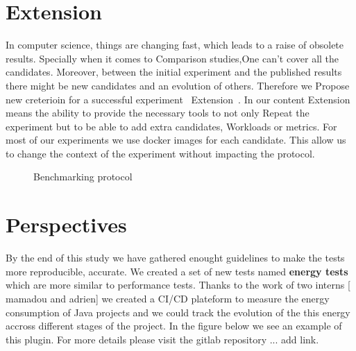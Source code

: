 \section{Extension}
In computer science, things are changing fast, which leads to a raise of obsolete results. Specially when it comes to Comparison studies,One can't cover all the candidates. 
Moreover, between the initial experiment and the published results there might be new candidates and an evolution of
others. Therefore we Propose new creterioin for a successful experiment ~Extension~.
In our content Extension means the ability to provide the necessary tools to not only Repeat the experiment but to be able to add extra candidates, Workloads or metrics.
For most of our experiments we use docker images for each candidate. This allow us to change the context of the experiment without impacting the protocol.


\begin{figure}%
    \caption{Benchmarking protocol}\label{fig:benchmarkingprotocol}
\end{figure}


\section{Perspectives}
By the end of this study we have gathered enought guidelines to make the tests more reproducible, accurate.
We created a set of new tests named \textbf{energy tests} which are more similar to performance tests. Thanks to the work of two interns [ mamadou and adrien] we created a CI/CD plateform to measure the energy consumption of Java projects and we could track the evolution of the this energy accross different stages of the project.
In the figure below we see an example of this plugin.
For more details please visit the gitlab repository ... add link.


